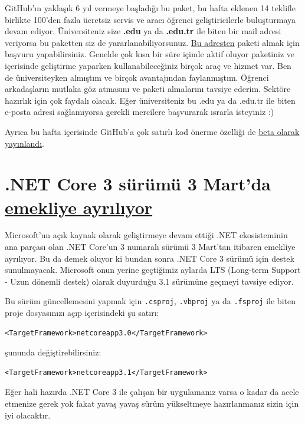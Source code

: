 \documentclass[11pt]{article}
\begin{document}
GitHub'ın yaklaşık 6 yıl vermeye başladığı bu paket, bu hafta eklenen 14
teklifle birlikte 100'den fazla ücretsiz servis ve aracı öğrenci
geliştiricilerle buluşturmaya devam ediyor. Üniversiteniz size \textbf{.edu} ya da
\textbf{.edu.tr} ile biten bir mail adresi veriyorsa bu paketten siz de
yararlanabiliyorsunuz. \href{https://education.github.com/pack}{Bu adresten} paketi almak için başvuru yapabilirsiniz.
Genelde çok kısa bir süre içinde aktif oluyor paketiniz ve içerisinde
geliştirme yaparken kullanabileceğiniz birçok araç ve hizmet var. Ben de
üniversiteyken almıştım ve birçok avantajından faylanmıştım. Öğrenci
arkadaşların mutlaka göz atmasını ve paketi almalarını tavsiye ederim. Sektöre
hazırlık için çok faydalı olacak. Eğer üniversiteniz bu .edu ya da .edu.tr ile
biten e-posta adresi sağlamıyorsa gerekli mercilere başvurarak ısrarla
isteyiniz :)

Ayrıca bu hafta içerisinde GitHub'a çok satırlı kod önerme özelliği de \href{https://github.blog/changelog/2020-02-26-multi-line-code-suggestions-beta/}{beta
olarak yayınlandı}.
\section{.NET Core 3 sürümü 3 Mart'da \href{https://devblogs.microsoft.com/dotnet/net-core-3-0-end-of-life/}{emekliye ayrılıyor}}
\label{sec:org9b20a5b}
Microsoft'un açık kaynak olarak geliştirmeye devam ettiği .NET ekosisteminin
ana parçası olan .NET Core'un 3 numaralı sürümü 3 Mart'tan itibaren emekliye
ayrılıyor. Bu da demek oluyor ki bundan sonra .NET Core 3 sürümü için destek
sunulmayacak. Microsoft onun yerine geçtiğimiz aylarda LTS (Long-term
Support - Uzun dönemli destek) olarak duyurduğu 3.1 sürümüne geçmeyi tavsiye
ediyor.

Bu sürüm güncellemesini yapmak için \texttt{.csproj}, \texttt{.vbproj} ya da \texttt{.fsproj} ile
biten proje dosyasınızı açıp içerisindeki şu satırı:
\begin{verbatim}
<TargetFramework>netcoreapp3.0</TargetFramework>
\end{verbatim}
şununda değiştirebilirsiniz:
\begin{verbatim}
<TargetFramework>netcoreapp3.1</TargetFramework>
\end{verbatim}

Eğer hali hazırda .NET Core 3 ile çalışan bir uygulamanız varsa o kadar da
acele etmenize gerek yok fakat yavaş yavaş sürüm yükseltmeye hazırlanmanız
sizin için iyi olacaktır.
\end{document}
